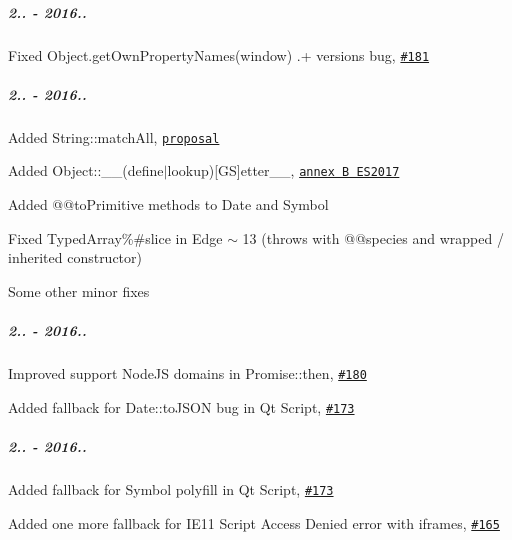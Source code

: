 \subparagraph*{2.. -\/ 2016..}


\begin{DoxyItemize}
\item Fixed {\ttfamily Object.\+get\+Own\+Property\+Names(window)} {.+} versions bug, \href{https://github.com/zloirock/core-js/issues/181}{\tt \#181}
\end{DoxyItemize}

\subparagraph*{2.. -\/ 2016..}


\begin{DoxyItemize}
\item Added {\ttfamily String\+::match\+All}, \href{https://github.com/tc39/String.prototype.matchAll}{\tt proposal}
\item Added {\ttfamily Object\+::\+\_\+\+\_\+(define$\vert$lookup)\mbox{[}GS\mbox{]}etter\+\_\+\+\_\+}, \href{https://github.com/tc39/ecma262/pull/381}{\tt annex B E\+S2017}
\item Added {\ttfamily @@to\+Primitive} methods to {\ttfamily Date} and {\ttfamily Symbol}
\item Fixed {\ttfamily Typed\+Array\%\#slice} in Edge $\sim$ 13 (throws with {\ttfamily @@species} and wrapped / inherited constructor)
\item Some other minor fixes
\end{DoxyItemize}

\subparagraph*{2.. -\/ 2016..}


\begin{DoxyItemize}
\item Improved support Node\+JS domains in {\ttfamily Promise\+::then}, \href{https://github.com/zloirock/core-js/issues/180}{\tt \#180}
\item Added fallback for {\ttfamily Date\+::to\+J\+S\+ON} bug in Qt Script, \href{https://github.com/zloirock/core-js/issues/173#issuecomment-193972502}{\tt \#173}
\end{DoxyItemize}

\subparagraph*{2.. -\/ 2016..}


\begin{DoxyItemize}
\item Added fallback for {\ttfamily Symbol} polyfill in Qt Script, \href{https://github.com/zloirock/core-js/issues/173}{\tt \#173}
\item Added one more fallback for I\+E11 {\ttfamily Script Access Denied} error with iframes, \href{https://github.com/zloirock/core-js/issues/165}{\tt \#165}
\end{DoxyItemize}

